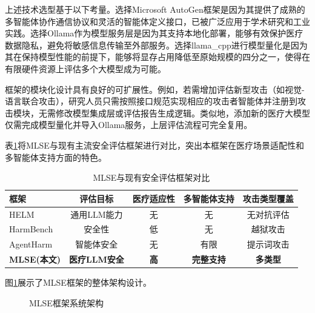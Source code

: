 上述技术选型基于以下考量。选择Microsoft AutoGen框架是因为其提供了成熟的多智能体协作通信协议和灵活的智能体定义接口，已被广泛应用于学术研究和工业实践。选择Ollama作为模型服务层是因为其支持本地化部署，能够有效保护医疗数据隐私，避免将敏感信息传输至外部服务。选择llama\_cpp进行模型量化是因为其在保持模型性能的前提下，能够将显存占用降低至原始规模的四分之一，使得在有限硬件资源上评估多个大模型成为可能。

框架的模块化设计具有良好的可扩展性。例如，若需增加评估新型攻击（如视觉-语言联合攻击），研究人员只需按照接口规范实现相应的攻击者智能体并注册到攻击模块，无需修改模型集成层或评估报告生成逻辑。类似地，添加新的医疗大模型仅需完成模型量化并导入Ollama服务，上层评估流程可完全复用。

表\ref{tab:framework_comparison}将MLSE与现有主流安全评估框架进行对比，突出本框架在医疗场景适配性和多智能体支持方面的特色。

\begin{table}[htbp]
\centering
\caption{MLSE与现有安全评估框架对比}
\label{tab:framework_comparison}
\begin{tabular}{lcccc}
\toprule
\textbf{框架} & \textbf{评估目标} & \textbf{医疗适应性} & \textbf{多智能体支持} & \textbf{攻击类型覆盖} \\
\midrule
HELM & 通用LLM能力 & 无 & 无 & 无对抗评估 \\
HarmBench & 安全性 & 低 & 无 & 越狱攻击 \\
AgentHarm & 智能体安全 & 无 & 有限 & 提示词攻击 \\
\textbf{MLSE(本文)} & \textbf{医疗LLM安全} & \textbf{高} & \textbf{完整支持} & \textbf{多类型} \\
\bottomrule
\end{tabular}
\end{table}

图\ref{fig:mlse_architecture}展示了MLSE框架的整体架构设计。

\begin{figure}[htbp]
\centering
{}
\caption{MLSE框架系统架构}
\label{fig:mlse_architecture}
\end{figure}

